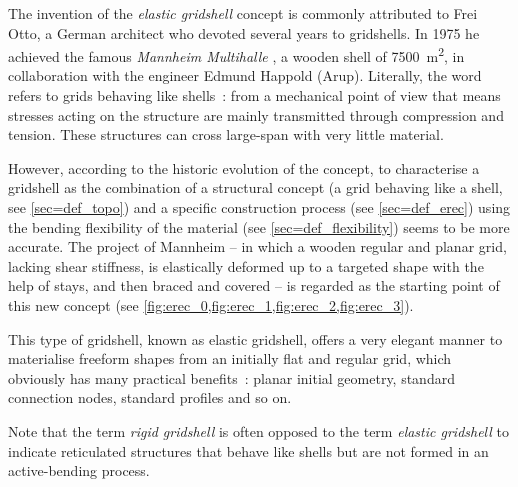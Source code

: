 The invention of the \emph{elastic gridshell} concept is commonly attributed to Frei Otto, a German architect who devoted several years to gridshells. In 1975 he achieved the famous \emph{Mannheim Multihalle} \cite{Happold1975}, a wooden shell of 7500~m\textsuperscript{2}, in collaboration with the engineer Edmund Happold (Arup).
Literally, the word  refers to grids behaving like shells~: from a mechanical point of view that means stresses acting on the structure are mainly transmitted through compression and tension. These structures can cross large-span with very little material.

However, according to the historic evolution of the concept, to characterise a gridshell as the combination of a structural concept (a grid behaving like a shell, see \cref{sec=def_topo}) and a specific construction process (see \cref{sec=def_erec}) using the bending flexibility of the material (see \cref{sec=def_flexibility}) seems to be more accurate. The project of Mannheim -- in which a wooden regular and planar grid, lacking shear stiffness, is elastically deformed up to a targeted shape with the help of stays, and then braced and covered -- is regarded as the starting point of this new concept (see \cref{fig:erec_0,fig:erec_1,fig:erec_2,fig:erec_3}).

This type of gridshell, known as elastic gridshell, offers a very elegant manner to materialise freeform shapes from an initially flat and regular grid, which obviously has many practical benefits~: planar initial geometry, standard connection nodes, standard profiles and so on.

Note that the term \emph{rigid gridshell} is often opposed to the term \emph{elastic gridshell} to indicate reticulated structures that behave like shells but are not formed in an active-bending process.


